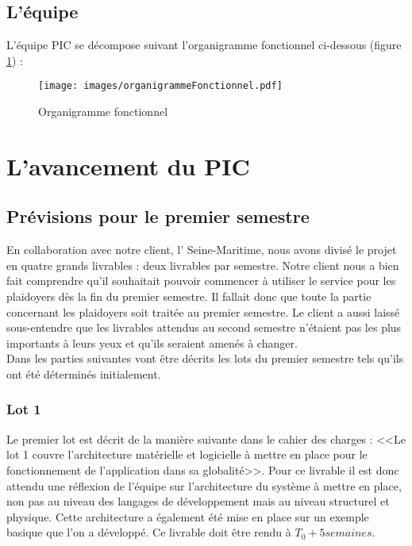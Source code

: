 \documentclass[asi]{picInsa}
\begin{document}
\section{L'équipe}
L'équipe PIC se décompose suivant l'organigramme fonctionnel ci-dessous (figure \ref{organigramme}) :
\begin{figure}[!h]
	\begin{center}
	\texttt{[image: images/organigrammeFonctionnel.pdf]}
	\label{organigramme}
	\caption{Organigramme fonctionnel}
	\end{center}
\end{figure} 





\chapter{L'avancement du PIC}
\label{avancement}
\section{Prévisions pour le premier semestre}
En collaboration avec notre client, l'\nomClient{} Seine-Maritime, nous avons divisé le projet en quatre grands livrables : deux livrables par semestre. Notre client nous a bien fait comprendre qu'il souhaitait pouvoir commencer à utiliser le service pour les plaidoyers dès la fin du premier semestre. Il fallait donc que toute la partie concernant les plaidoyers soit traitée au premier semestre. Le client a aussi laissé sous-entendre que les livrables attendus au second semestre n'étaient pas les plus importants à leurs yeux et qu'ils seraient amenés à changer.\vspace{0.5cm}\\
Dans les parties suivantes vont être décrits les lots du premier semestre tels qu'ils ont été déterminés initialement.

\subsection{Lot 1}
Le premier lot est décrit de la manière suivante dans le cahier des charges : <<Le lot 1 couvre l'architecture matérielle et logicielle à mettre en place pour le fonctionnement de l'application dans sa globalité>>. Pour ce livrable il est donc attendu une réflexion de l'équipe sur l'architecture du système à mettre en place, non pas au niveau des langages de développement mais au niveau structurel et physique. Cette architecture a également été mise en place sur un exemple basique que l'on a développé. Ce livrable doit être rendu à $T_{0}+5 semaines$. 
\end{document}

